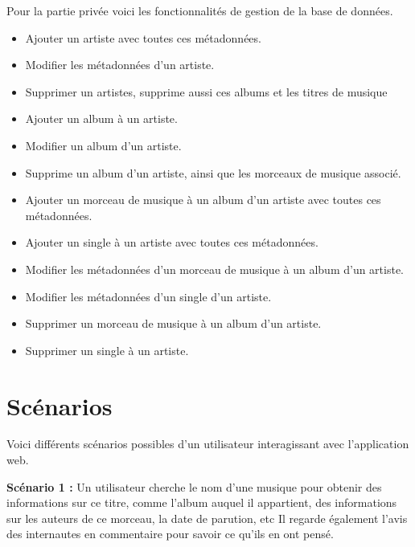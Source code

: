     \begin{paragraphe}
      Pour la partie privée voici les fonctionnalités de gestion de la base de
      données.
    \end{paragraphe}

    \begin{paragraphe}
      \begin{itemize}
        \item Ajouter un artiste avec toutes ces métadonnées.
        \item Modifier les métadonnées d'un artiste.
        \item Supprimer un artistes, supprime aussi ces albums et les titres de
          musique
        \item Ajouter un album à un artiste.
        \item Modifier un album d'un artiste.
        \item Supprime un album d'un artiste, ainsi que les morceaux de musique
          associé.
        \item Ajouter un morceau de musique à un album d'un artiste avec toutes
          ces métadonnées.
        \item Ajouter un single à un artiste avec toutes ces métadonnées.
        \item Modifier les métadonnées d'un morceau de musique à un album
          d'un artiste.
        \item Modifier les métadonnées d'un single d'un artiste.
        \item Supprimer un morceau de musique à un album d'un artiste.
        \item Supprimer un single à un artiste.
      \end{itemize}
    \end{paragraphe}

\section{Scénarios}

  \begin{paragraphe}
    Voici différents scénarios possibles d'un utilisateur interagissant avec
    l'application web.
  \end{paragraphe}

  \begin{paragraphe}
    \textbf{Scénario 1 :}
    Un utilisateur cherche le nom d'une musique pour obtenir des informations
    sur ce titre, comme l'album auquel il appartient, des informations sur les
    auteurs de ce morceau, la date de parution, etc Il regarde également l'avis
    des internautes en commentaire pour savoir ce qu'ils en ont pensé.
  \end{paragraphe}

